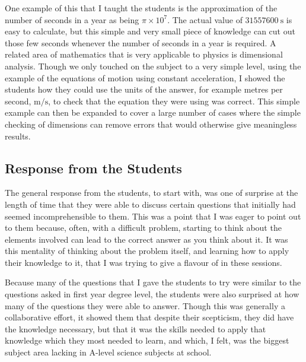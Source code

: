     One example of this that I taught the students is the approximation of the number of seconds in a year as being $\pi \times 10^{7}$. The actual value of $\SI{31557600}{\second}$ is easy to calculate, but this simple and very small piece of knowledge can cut out those few seconds whenever the number of seconds in a year is required. A related area of mathematics that is very applicable to physics is dimensional analysis. Though we only touched on the subject to a very simple level, using the example of the equations of motion using constant acceleration, I showed the students how they could use the units of the answer, for example metres per second, $\si{\metre\per\second}$, to check that the equation they were using was correct. This simple example can then be expanded to cover a large number of cases where the simple checking of dimensions can remove errors that would otherwise give meaningless results.

    \subsection{Response from the Students} %
    \label{sub:Response from the Students}
        The general response from the students, to start with, was one of surprise at the length of time that they were able to discuss certain questions that initially had seemed incomprehensible to them. This was a point that I was eager to point out to them because, often, with a difficult problem, starting to think about the elements involved can lead to the correct answer as you think about it. It was this mentality of thinking about the problem itself, and learning how to apply their knowledge to it, that I was trying to give a flavour of in these sessions.

        Because many of the questions that I gave the students to try were similar to the questions asked in first year degree level, the students were also surprised at how many of the questions they were able to answer. Though this was generally a collaborative effort, it showed them that despite their scepticism, they did have the knowledge necessary, but that it was the skills needed to apply that knowledge which they most needed to learn, and which, I felt, was the biggest subject area lacking in A-level science subjects at school.
